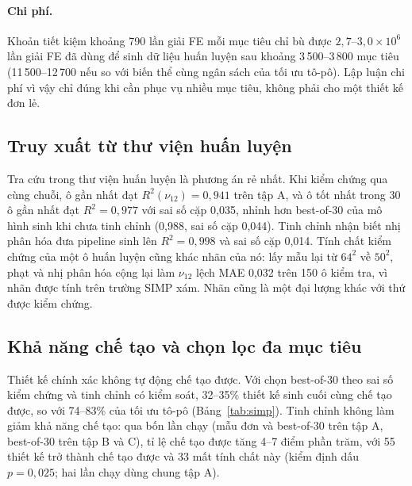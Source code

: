 \documentclass[a4paper,11pt]{article}
\newcommand{\nuot}{\nu_{12}}
\newcommand{\RR}{R^2}
\begin{document}
\paragraph{Chi phí.}
Khoản tiết kiệm khoảng 790 lần giải FE mỗi mục tiêu chỉ bù được
$2,7$--$3,0\times10^{6}$ lần giải FE đã dùng để sinh dữ liệu huấn luyện sau
khoảng 3\,500--3\,800 mục tiêu (11\,500--12\,700 nếu so với biến thể cùng
ngân sách của tối ưu tô-pô). Lập luận chi phí vì vậy chỉ đúng khi cần phục
vụ nhiều mục tiêu, không phải cho một thiết kế đơn lẻ.

\subsection{Truy xuất từ thư viện huấn luyện}
\label{sec:retr}
Tra cứu trong thư viện huấn luyện là phương án rẻ nhất. Khi kiểm chứng qua
cùng chuỗi, ô gần nhất đạt $\RR(\nuot)=0,941$ trên tập A, và ô tốt nhất trong
30 ô gần nhất đạt $\RR=0,977$ với sai số cặp 0,035, nhỉnh hơn best-of-30 của
mô hình sinh khi chưa tinh chỉnh (0,988, sai số cặp 0,044). Tinh chỉnh nhận
biết nhị phân hóa đưa pipeline sinh lên $\RR=0,998$ và sai số cặp 0,014.
Tính chất kiểm chứng của một ô huấn luyện cũng khác nhãn của nó: lấy mẫu lại
từ $64^2$ về $50^2$, phạt và nhị phân hóa cộng lại làm $\nuot$ lệch MAE
0,032 trên 150 ô kiểm tra, vì nhãn được tính trên trường SIMP xám. Nhãn cũng
là một đại lượng khác với thứ được kiểm chứng.

\subsection{Khả năng chế tạo và chọn lọc đa mục tiêu}
\label{sec:multi}

Thiết kế chính xác không tự động chế tạo được. Với chọn best-of-30 theo sai
số kiểm chứng và tinh chỉnh có kiểm soát, 32--35\% thiết kế sinh cuối cùng
chế tạo được, so với 74--83\% của tối ưu tô-pô (Bảng~\ref{tab:simp}). Tinh
chỉnh không làm giảm khả năng chế tạo: qua bốn lần chạy (mẫu đơn và best-of-30
trên tập A, best-of-30 trên tập B và C), tỉ lệ chế tạo được tăng 4--7 điểm
phần trăm, với 55 thiết kế trở thành chế tạo được và 33 mất tính chất này
(kiểm định dấu $p=0,025$; hai lần chạy dùng chung tập A).
\end{document}

